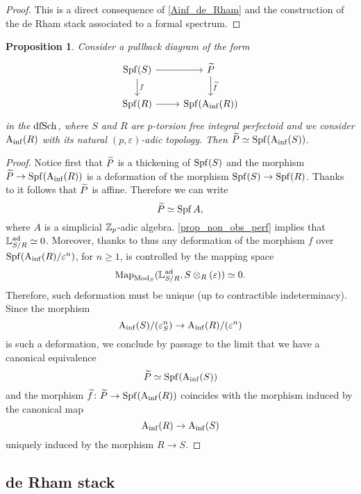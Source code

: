 \documentclass[10pt,a4paper]{amsart}
\numberwithin{equation}{subsection}
\newtheorem{proposition}[theorem]{Proposition}
\theoremstyle{definition}
\begin{document}
\begin{proof}
    This is a direct consequence of \cref{Ainf_de_Rham} and the construction of the de Rham stack associated to a formal spectrum. 
\end{proof}

\begin{proposition}
Consider a pullback diagram of the form
    \[
    \begin{tikzcd}
            \Spf(S) \ar{r} \ar{d}{f} & \tP \ar{d}{\widetilde{f}} \\
            \Spf(R) \ar{r} & \Spf (\Ainf(R))
    \end{tikzcd}
    \]
in the \infcat $\mathrm{dfSch}$, where $S$ and $R$ are $p$-torsion free integral perfectoid and we consider $\mathrm{A}_{\mathrm{inf}}(R)$ with its natural $(p, \varepsilon)$-adic topology. Then $\widetilde{P} \simeq \operatorname{Spf} (\mathrm{A}_{\mathrm{inf}}(S))$. 
\end{proposition}

\begin{proof} Notice first that $\widetilde{P}$ is a thickening of $\operatorname{Spf}(S)$ and the morphism $\widetilde{P} \to \operatorname{Spf}(\mathrm{A}_{\mathrm{inf}}(R))$ is a deformation of the morphism $\operatorname{Spf}(S) \to \operatorname{Spf}(R)$.
    Thanks to \cite[\href{https://stacks.math.columbia.edu/tag/06AD}{Tag 06AD}]{stacks-project} it follows that $\widetilde{P}$ is affine. Therefore we can write
        \[
            \widetilde{P} \simeq \operatorname{Spf} A,
        \]
    where $A$ is a simplicial $\mathbb Z_p$-adic algebra. \cref{prop_non_obs_perf} implies that $\mathbb{L}^{\mathrm{ad}}_{S/ R} \simeq 0$. Moreover, thanks to \cite[Theorem 8.4.2.7]{Lurie_Higher_algebra}  thus any deformation of the morphism $f$ over $\operatorname{Spf}(\mathrm{A}_{\mathrm{inf}}(R)/\varepsilon^n)$, for $n \geq 1$, is controlled by the mapping space
        \[
                \mathrm{Map}_{\mathrm{Mod}_S}(\mathbb{L}^{\mathrm{ad}}_{S/R}, S \otimes_R ( \varepsilon)) \simeq 0.
        \]  
    Therefore, such deformation must be unique (up to contractible indeterminacy). Since the morphism
        \[
            \mathrm{A}_{\mathrm{inf}}(S)/(\varepsilon_S^n) \to \mathrm{A}_{\mathrm{inf}}(R)/(\varepsilon^n)
        \]
    is such a deformation, we conclude by passage to the limit that we have a canonical equivalence
        \[
                \widetilde{P} \simeq \operatorname{Spf}(\mathrm{A}_{\mathrm{inf}}(S))  
        \]
    and the morphism $\widetilde{f} \colon \widetilde{P} \to \operatorname{Spf}(\mathrm{A}_{\mathrm{inf}}(R))$ coincides with the morphism induced by the canonical map
        \[
                \mathrm{A}_{\mathrm{inf}}(R) \to \mathrm{A}_{\mathrm{inf}}(S)
        \]
    uniquely induced by the morphism $R \to S$.
\end{proof}


\subsection{de Rham stack}
\end{document}
